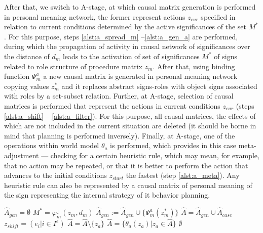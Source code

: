 \documentclass[review]{elsarticle}
\begin{document}
After that, we switch to A-stage, at which causal matrix generation is performed in personal meaning network, the former represent actions $z_{cur}$ specified in relation to current conditions determined by the active significances of the set $M^*$. For this purpose, steps \ref{alst:a_spread_m} --\ref{alst:a_gen_a} are performed, during which the propagation of activity in causal network of significances over the distance of $d_m$ leads to the activation of set of significances $M^*$ of signs related to role structure of procedure matrix $z_m$. After that, using binding function $\Psi_m^a$ a new causal matrix is generated in personal meaning network copying values $z_m^*$ and it replaces abstract signs-roles with object signs associated with roles by a set-subset relation. Further, at A-stage, selection of causal matrices is performed that represent the actions  in current conditions $z_{cur}$ (steps \ref{alst:a_shift} -- \ref{alst:a_filter}). For this purpose, all causal matrices, the effects of which are not included in the current situation are deleted (it should be borne in mind that planning is performed inversely). Finally, at A-stage, one of the operations within world model $\theta_a$ is performed, which provides in this case meta-adjustment --- checking for a certain heuristic rule, which may mean, for example, that no action may be repeated, or that it is better to perform the action that advances to the initial conditions $z_{start}$ the fastest (step \ref{alst:a_meta}). Any heuristic rule can also be represented by a causal matrix of personal meaning of the sign representing the internal strategy of it behavior planning.

\begin{algorithm}
	\begin{algorithmic}[1]
		\Statex{}
		\State $\hat A_{gen}=\emptyset$
		\Statex{}
		\State $M^*=\varphi_m^\downarrow(z_m, d_m)$\label{alst:a_spread_m}
		\State $\hat A_{gen} := \hat A_{gen}\cup\{\Psi_m^a(z_m^*)\}$ \label{alst:a_gen_a}
		\EndFor
		\EndFor
		\Statex{}
		\State $\hat A = \hat A_{gen}\cup \hat A_{case}$
		\State $z_{shift}=(e_i|i\in I^e)$ \label{alst:a_shift}
		\State $\hat A = \hat A\setminus\{z_a\}$ \label{alst:a_filter}
		\EndIf
		\EndFor
		\Statex{}
		\State $\hat A=\{\theta_a(z_a)|z_a\in\hat A\}$ \label{alst:a_meta}
		\State\Return $\emptyset$
		\EndIf
	\end{algorithmic}
\end{algorithm}
\end{document}

